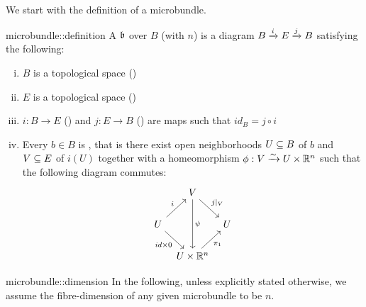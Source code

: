 \begin{myparagraph}
    We start with the definition of a microbundle.
\end{myparagraph}

\begin{mydefinition}[microbundle]{microbundle::definition}
    A  $\bb$ over $B$ (with  $n$)
    is a diagram $\bundle{B}{E}{i}{j}$ satisfying the following:
    \begin{enumerate}[(i)]
        \item $B$ is a topological space ()
        \item $E$ is a topological space ()
        \item $i: B \to E$ () and $j: E \to B$ ()
        are maps such that $id_B = j \circ i$
        \item Every $b \in B$ is ,
        that is there exist open neighborhoods $U \sub B$ of $b$ and $V \sub E$ of $i(U)$
        together with a homeomorphism $\phi: V \isomto U \times \R^n$ such that the following diagram commutes:
        \[
            \begin{tikzcd}[column sep=tiny]
                & V \ar[dr, "j\vert_V"] \ar[dd, "\psi"] & \\
                U \ar[ur, "i"] \ar[dr, "{id \times 0}"'] & & U \\
                & U \times\R^n \ar[ur, "\pi_1"'] &
            \end{tikzcd}
        \]
    \end{enumerate}
\end{mydefinition}

\begin{myremark}{microbundle::dimension}
    In the following, unless explicitly stated otherwise,
    we assume the fibre-dimension of any given microbundle to be $n$.
\end{myremark}